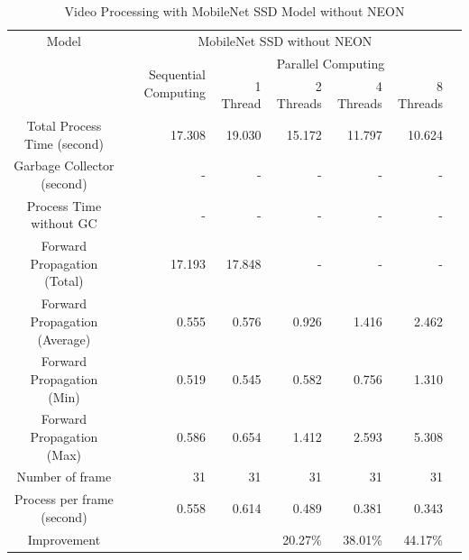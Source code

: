         \begin{table}[!htp]\centering
            \scriptsize
            \begin{tabular}{lrrrrrrr}\toprule
                \multicolumn{2}{c}{Model} &\multicolumn{5}{c}{MobileNet SSD without NEON} \\\cmidrule{1-7}
                \multicolumn{2}{c}{\multirow{2}{*}{}} &\multirow{2}{*}{Sequential Computing} &\multicolumn{4}{c}{Parallel Computing} \\\cmidrule{4-7}
                & & &1 Thread &2 Threads &4 Threads &8 Threads \\\midrule
                \multicolumn{2}{c}{Total Process Time (second)} &17.308 &19.030 &15.172 &11.797 &10.624 \\
                \multicolumn{2}{c}{Garbage Collector (second)} &- &- &- &- &- \\
                \multicolumn{2}{c}{Process Time without GC} &- &- &- &- &- \\
                \multicolumn{2}{c}{Forward Propagation (Total)} &17.193 &17.848 &- &- &- \\
                \multicolumn{2}{c}{Forward Propagation (Average)} &0.555 &0.576 &0.926 &1.416 &2.462 \\
                \multicolumn{2}{c}{Forward Propagation (Min)} &0.519 &0.545 &0.582 &0.756 &1.310 \\
                \multicolumn{2}{c}{Forward Propagation (Max)} &0.586 &0.654 &1.412 &2.593 &5.308 \\
                \multicolumn{2}{c}{Number of frame} &31 &31 &31 &31 &31 \\
                \multicolumn{2}{c}{Process per frame (second)} &0.558 &0.614 &0.489 &0.381 &0.343 \\
                \multicolumn{2}{c}{Improvement} & & &20.27\% &38.01\% &44.17\% \\
                \bottomrule
            \end{tabular}

            \caption{Video Processing with MobileNet SSD Model without NEON}\label{ssd:non-neon-performance}
        \end{table}

